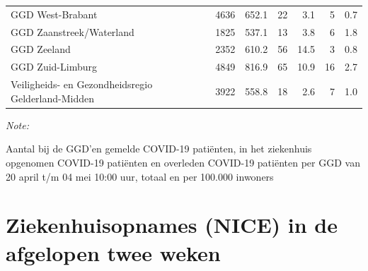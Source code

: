 \documentclass[
  english,
  man,floatsintext]{apa6}
\begin{document}
\begin{table}
\begin{threeparttable}
\begin{tabular}{lrrrrrr}
GGD West-Brabant & 4636 & 652.1 & 22 & 3.1 & 5 & 0.7\\
GGD Zaanstreek/Waterland & 1825 & 537.1 & 13 & 3.8 & 6 & 1.8\\
GGD Zeeland & 2352 & 610.2 & 56 & 14.5 & 3 & 0.8\\
GGD Zuid-Limburg & 4849 & 816.9 & 65 & 10.9 & 16 & 2.7\\
Veiligheids- en Gezondheidsregio Gelderland-Midden & 3922 & 558.8 & 18 & 2.6 & 7 & 1.0\\
\bottomrule
\end{tabular}
\begin{tablenotes}
\item \textit{Note: } 
\item Aantal bij de GGD’en gemelde COVID-19 patiënten, in het ziekenhuis opgenomen COVID-19 patiënten en overleden COVID-19 patiënten per GGD van 20 april t/m 04 mei 10:00 uur, totaal en per 100.000 inwoners
\end{tablenotes}
\end{threeparttable}
\endgroup{}
\end{table}

\newpage

\hypertarget{ziekenhuisopnames-nice-in-de-afgelopen-twee-weken}{%
\section{Ziekenhuisopnames (NICE) in de afgelopen twee weken}\label{ziekenhuisopnames-nice-in-de-afgelopen-twee-weken}}
\end{document}
